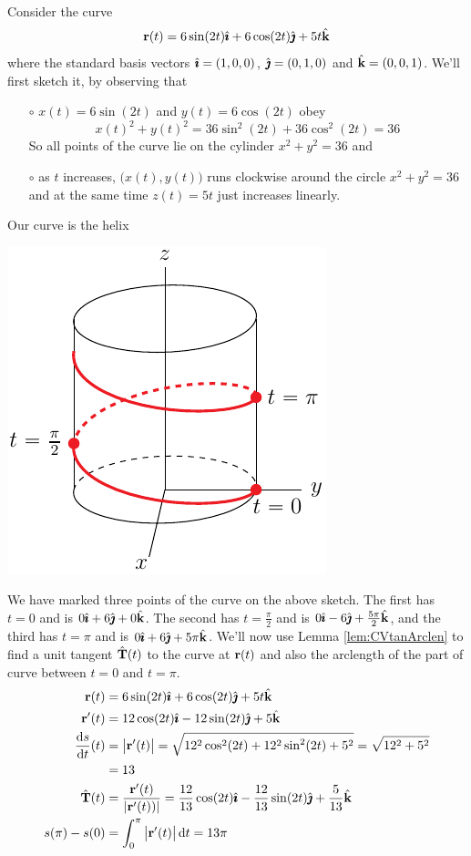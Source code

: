 \begin{eg}\label{eg:paramHelix}
Consider the curve
\begin{equation*}
\mathbf{r}(t) = 6\sin(2t)\hat{\pmb{\imath}} + 6\cos(2t)\hat{\pmb{\jmath}} +5t\hat{\mathbf{k}}
\end{equation*}
where the standard basis vectors $\hat{\pmb{\imath}} = (1,0,0)$, $\hat{\pmb{\jmath}}=(0,1,0)$ 
and $\hat{\mathbf{k}} =(0,0,1)$.
We'll first sketch it, by observing that
\begin{itemize}\itemsep1pt \parskip0pt  %
\item[$\circ$] $x(t)=6\sin(2t)$ and $y(t) =6\cos(2t)$ obey
\begin{equation*}
x(t)^2+y(t)^2 = 36 \sin^2(2t) + 36\cos^2(2t) = 36
\end{equation*}
So all points of the curve lie on the cylinder $x^2+y^2=36$ and
\item[$\circ$] as $t$ increases, $\big(x(t),y(t)\big)$ runs clockwise 
around the circle $x^2+y^2=36$ and at the same time $z(t) = 5t$ 
just increases linearly.
\end{itemize}
Our curve is the helix
\begin{efig}
\begin{center}
     \includegraphics{helix4.pdf}
\end{center}
\end{efig}
We have marked three points of the curve on the above sketch. The first has
$t=0$ and is $0\hat{\pmb{\imath}}+6\hat{\pmb{\jmath}}+0\hat{\mathbf{k}}$. The second has $t=\frac{\pi}{2}$ and is $0\hat{\pmb{\imath}}-6\hat{\pmb{\jmath}}+\frac{5\pi}{2}\hat{\mathbf{k}}$, and the third has $t=\pi$ and is 
$0\hat{\pmb{\imath}}+6\hat{\pmb{\jmath}}+5\pi\hat{\mathbf{k}}$.
We'll now use Lemma \ref{lem:CVtanArclen} to find a unit tangent
$\hat{\mathbf{T}}(t)$ to the curve at $\mathbf{r}(t)$ and also the arclength of the part of curve between $t=0$ and $t=\pi$.
\begin{align*}
\vr(t) &= 6\sin(2t)\hi + 6\cos(2t)\hj +5t\hk \\
\vr'(t) &= 12\cos(2t)\hi -12\sin(2t)\hj +5\hk \\
\diff{s}{t}(t)&=\big|\vr'(t)\big| 
=\sqrt{12^2\cos^2(2t) +12^2\sin^2(2t)+5^2}
= \sqrt{12^2+5^2}\\
& = 13\\
\hat\vT(t) &= \frac{\vr'(t)}{|\vr'(t))|}
               =  \frac{12}{13}\cos(2t)\hi -\frac{12}{13}\sin(2t)\hj +\frac{5}{13}\hk \\
s(\pi)-s(0)&= \int_{0}^\pi \big|\vr'(t)\big|\,\dee{t}
          =13\pi
\end{align*}
\end{eg}
